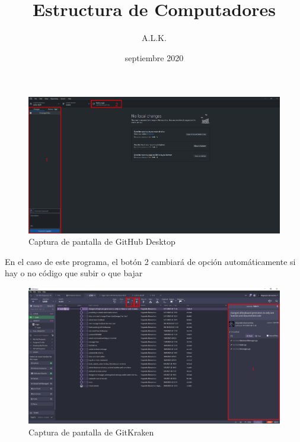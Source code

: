 \documentclass[twoside]{AiTeX}
\title{Estructura de Computadores}
\author{A.L.K.}
\date{septiembre 2020}
\begin{document}
\portadaApuntes
\pagestyle{empty}
\tableofcontents
\pagestyle{empty}
\justify







\begin{figure}[H]
    \centering
    \includegraphics[width=\textwidth]{Capura-Git.PNG}
    \caption{Captura de pantalla de GitHub Desktop}
    \label{fig:cap_git}
\end{figure}

En el caso de este programa, el botón 2 cambiará de opción automáticamente si hay o no código que subir o que bajar

\begin{figure}[H]
    \centering
    \includegraphics[width=\textwidth]{Capura-Kraken.PNG}
    \caption{Captura de pantalla de GitKraken}
    \label{fig:cap_kraken}
\end{figure}

\printglossary[title={Glosario}]

\let\cleardoublepage\clearpage
\listoffigures
{}
\let\cleardoublepage\clearpage

\listoftables
{}
\end{document}
